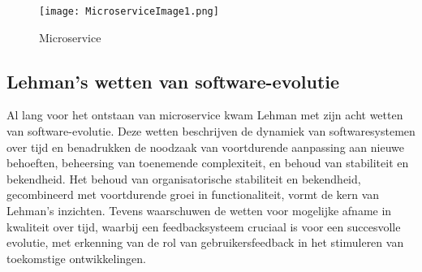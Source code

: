 \begin{figure}[h]
	\centering	
	\texttt{[image: MicroserviceImage1.png]} 
	\caption{Microservice} 
	\label{fig:Microservice} 
\end{figure}
\FloatBarrier

\subsection*{Lehman's wetten van software-evolutie}
Al lang voor het ontstaan van microservice kwam Lehman met zijn acht wetten van software-evolutie. Deze wetten beschrijven de dynamiek van softwaresystemen over tijd en benadrukken de noodzaak van voortdurende aanpassing aan nieuwe behoeften, beheersing van toenemende complexiteit, en behoud van stabiliteit en bekendheid. Het behoud van organisatorische stabiliteit en bekendheid, gecombineerd met voortdurende groei in functionaliteit, vormt de kern van Lehman's inzichten. Tevens waarschuwen de wetten voor mogelijke afname in kwaliteit over tijd, waarbij een feedbacksysteem cruciaal is voor een succesvolle evolutie, met erkenning van de rol van gebruikersfeedback in het stimuleren van toekomstige ontwikkelingen.

